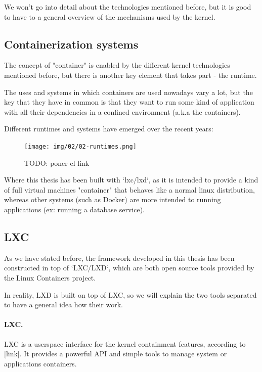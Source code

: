 We won't go into detail about the technologies mentioned before, but it is good to have to a general overview of the mechanisms used by the kernel.


\bigskip
\subsection{Containerization systems}
The concept of "container" is enabled by the different kernel technologies mentioned before, but there is another key element that takes part - the runtime.

The uses and systems in which containers are used nowadays vary a lot, but the key that they have in common is that they want to run some kind of application with all their dependencies in a confined environment (a.k.a the containers).

Different runtimes and systems have emerged over the recent years:
\begin{figure}[H]
	\label{fig:Runtimes containers landscape}
	\centering
	\texttt{[image: img/02/02-runtimes.png]}
	\caption[Runtimes lansdcape]{\footnotesize{TODO: poner el link}}
\end{figure}

Where this thesis has been built with `lxc/lxd`, as it is intended to provide a kind of full virtual machines "container" that behaves like a normal linux distribution, whereas other systems (such as Docker) are more intended to running applications (ex: running a database service).

\subsection{LXC}
As we have stated before, the framework developed in this thesis has been constructed in top of `LXC/LXD`, which are both open source tools provided by the Linux Containers project.

In reality, LXD is built on top of LXC, so we will explain the two tools separated to have a general idea how their work.

\paragraph{LXC.} LXC is a userspace interface for the kernel containment features, according to [link]. It provides a powerful API and simple tools to manage system or applications containers.

